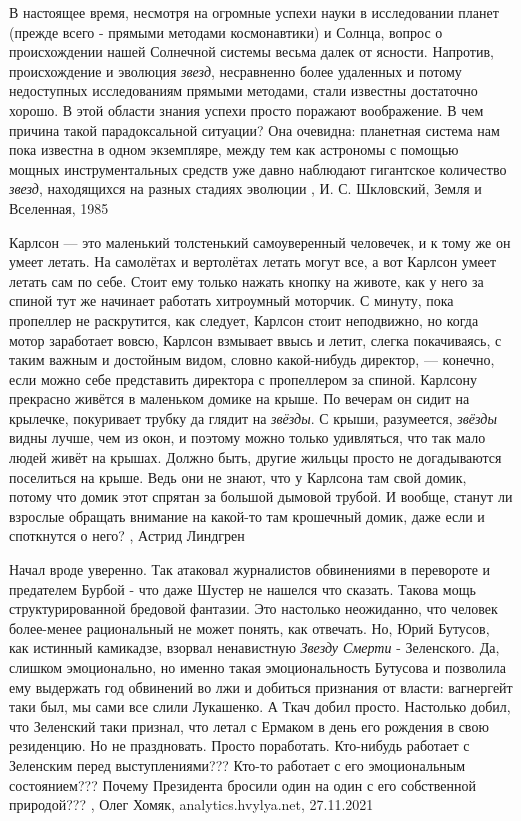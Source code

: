 В настоящее время, несмотря на огромные успехи науки в исследовании планет
(прежде всего - прямыми методами космонавтики) и Солнца, вопрос о происхождении
нашей Солнечной системы весьма далек от ясности. Напротив, происхождение и
эволюция \emph{звезд}, несравненно более удаленных и потому недоступных
исследованиям прямыми методами, стали известны достаточно хорошо. В этой
области знания успехи просто поражают воображение. В чем причина такой
парадоксальной ситуации? Она очевидна: планетная система нам пока известна в
одном экземпляре, между тем как астрономы с помощью мощных инструментальных
средств уже давно наблюдают гигантское количество \emph{звезд}, находящихся на
разных стадиях эволюции
, И. С. Шкловский, Земля и Вселенная, 1985


Карлсон — это маленький толстенький самоуверенный человечек, и к тому же он
умеет летать. На самолётах и вертолётах летать могут все, а вот Карлсон умеет
летать сам по себе. Стоит ему только нажать кнопку на животе, как у него за
спиной тут же начинает работать хитроумный моторчик. С минуту, пока пропеллер
не раскрутится, как следует, Карлсон стоит неподвижно, но когда мотор
заработает вовсю, Карлсон взмывает ввысь и летит, слегка покачиваясь, с таким
важным и достойным видом, словно какой-нибудь директор, — конечно, если можно
себе представить директора с пропеллером за спиной.  Карлсону прекрасно живётся
в маленьком домике на крыше. По вечерам он сидит на крылечке, покуривает трубку
да глядит на \emph{звёзды}. С крыши, разумеется, \emph{звёзды} видны лучше, чем
из окон, и поэтому можно только удивляться, что так мало людей живёт на крышах.
Должно быть, другие жильцы просто не догадываются поселиться на крыше. Ведь они
не знают, что у Карлсона там свой домик, потому что домик этот спрятан за
большой дымовой трубой. И вообще, станут ли взрослые обращать внимание на
какой-то там крошечный домик, даже если и споткнутся о него?
, Астрид Линдгрен

Начал вроде уверенно. Так атаковал журналистов обвинениями в перевороте и
предателем Бурбой - что даже Шустер не нашелся что сказать. Такова мощь
структурированной бредовой фантазии. Это настолько неожиданно, что человек
более-менее рациональный не может понять, как отвечать.  Но, Юрий Бутусов, как
истинный камикадзе, взорвал ненавистную \emph{Звезду Смерти} - Зеленского. Да, слишком
эмоционально, но именно такая эмоциональность Бутусова и позволила ему
выдержать год обвинений во лжи и добиться признания от власти: вагнергейт таки
был, мы сами все слили Лукашенко.  А Ткач добил просто. Настолько добил, что
Зеленский таки признал, что летал с Ермаком в день его рождения в свою
резиденцию. Но не праздновать. Просто поработать.  Кто-нибудь работает с
Зеленским перед выступлениями??? Кто-то работает с его эмоциональным
состоянием??? Почему Президента бросили один на один с его собственной
природой???
, 
Олег Хомяк, analytics.hvylya.net, 27.11.2021
